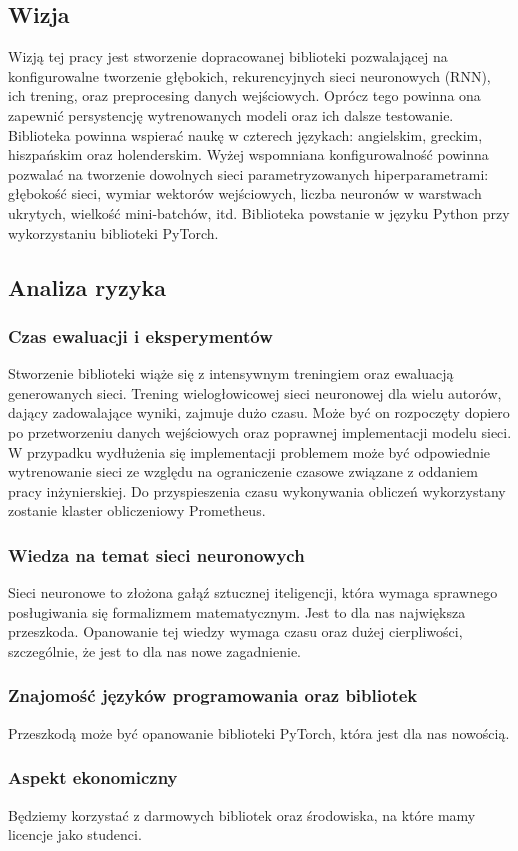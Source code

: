 \subsection{Wizja}
Wizją tej pracy jest stworzenie dopracowanej biblioteki pozwalającej na konfigurowalne tworzenie 
głębokich, rekurencyjnych sieci neuronowych (RNN), ich trening, oraz preprocesing danych wejściowych. Oprócz tego powinna ona 
zapewnić persystencję wytrenowanych modeli oraz ich dalsze testowanie. Biblioteka powinna wspierać 
naukę w czterech językach: angielskim, greckim, hiszpańskim oraz holenderskim. Wyżej wspomniana konfigurowalność powinna 
pozwalać na tworzenie dowolnych sieci parametryzowanych hiperparametrami: głębokość sieci, wymiar 
wektorów wejściowych, liczba neuronów w warstwach ukrytych, wielkość mini-batchów, itd.
Biblioteka powstanie w języku Python przy wykorzystaniu biblioteki PyTorch.

\subsection{Analiza ryzyka}

\subsubsection{Czas ewaluacji i eksperymentów}
Stworzenie biblioteki wiąże się z intensywnym treningiem oraz ewaluacją
generowanych sieci. Trening wielogłowicowej sieci neuronowej dla wielu autorów, dający zadowalające 
wyniki, zajmuje dużo czasu. Może być on rozpoczęty dopiero po przetworzeniu danych wejściowych
oraz poprawnej implementacji modelu sieci. W przypadku wydłużenia się implementacji problemem może być
odpowiednie wytrenowanie sieci ze względu na ograniczenie czasowe związane z oddaniem pracy inżynierskiej.
Do przyspieszenia czasu wykonywania obliczeń wykorzystany zostanie klaster obliczeniowy Prometheus.

\subsubsection{Wiedza na temat sieci neuronowych}
Sieci neuronowe to złożona gałąź sztucznej iteligencji, która wymaga sprawnego posługiwania się formalizmem matematycznym.
Jest to dla nas największa przeszkoda. Opanowanie tej wiedzy wymaga czasu oraz dużej cierpliwości, 
szczególnie, że jest to dla nas nowe zagadnienie.

\subsubsection{Znajomość języków programowania oraz bibliotek }
Przeszkodą może być opanowanie biblioteki PyTorch, która jest dla nas nowością.

\subsubsection{Aspekt ekonomiczny }
Będziemy korzystać z darmowych bibliotek oraz środowiska, na które mamy licencje jako studenci.